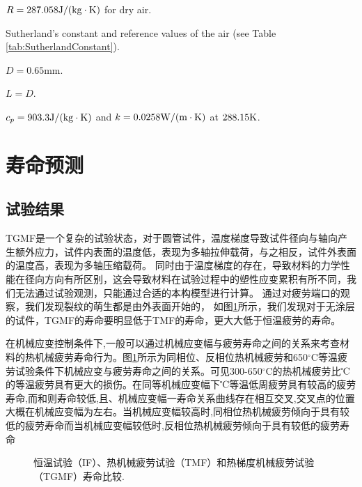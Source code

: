\documentclass{article}
\begin{document}
\begin{table}[htbp]
\begin{threeparttable}
\begin{tabular}{llrrrr}
    \bottomrule
    \end{tabular}%
    \begin{tablenotes}
    \item[*1] $R = 287.058 {\rm{J/(kg}} \cdot {\rm{K}})$ for dry air.
    \item[*2] Sutherland's constant and reference values of the air (see Table \ref{tab:SutherlandConstant}).
    \item[*3] $D=0.65$mm.
    \item[*4] $L=D$.
    \item[*5] $c_{p}=903.3 {\rm{J/(kg}} \cdot {\rm{K}})$ and $k=0.0258 {\rm{W/(m}} \cdot {\rm{K}})$ at $288.15{\rm{K}}$.
    \end{tablenotes}
    \end{threeparttable}
  \label{tab:addlabel}%
\end{table}%

\section{寿命预测}
\subsection{试验结果}
TGMF是一个复杂的试验状态，对于圆管试件，温度梯度导致试件径向与轴向产生额外应力，试件内表面的温度低，表现为多轴拉伸载荷，与之相反，试件外表面的温度高，表现为多轴压缩载荷。
同时由于温度梯度的存在，导致材料的力学性能在径向方向有所区别，这会导致材料在试验过程中的塑性应变累积有所不同，我们无法通过试验观测，只能通过合适的本构模型进行计算。
通过对疲劳端口的观察，我们发现裂纹的萌生都是由外表面开始的，
如图\ref{Fig:plot_exp_fatigue_life}所示，我们发现对于无涂层的试件，TGMF的寿命要明显低于TMF的寿命，更大大低于恒温疲劳的寿命。

在机械应变控制条件下,一般可以通过机械应变幅与疲劳寿命之间的关系来考查材料的热机械疲劳寿命行为。图\ref{Fig:plot_exp_fatigue_life}所示为同相位、反相位热机械疲劳和650$^{\circ}$C等温疲劳试验条件下机械应变与疲劳寿命之间的关系。可见300-650$^{\circ}$C的热机械疲劳比℃的等温疲劳具有更大的损伤。在同等机械应变幅下℃等温低周疲劳具有较高的疲劳寿命,而和则寿命较低,且、机械应变幅一寿命关系曲线存在相互交叉,交叉点的位置大概在机械应变幅为左右。当机械应变幅较高时,同相位热机械疲劳倾向于具有较低的疲劳寿命而当机械应变幅较低时,反相位热机械疲劳倾向于具有较低的疲劳寿命
\begin{figure}[!htp]
\caption{恒温试验（IF）、热机械疲劳试验（TMF）和热梯度机械疲劳试验（TGMF）寿命比较.}
\label{Fig:plot_exp_fatigue_life}
\end{figure}
\end{document}
